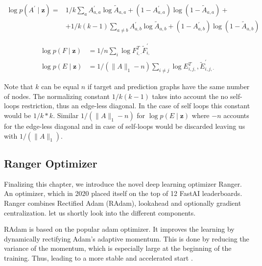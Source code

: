 {\begin{equation}
    \begin{split}
        \log p\left(A^{\prime} \mid \mathbf{z}\right) = &1 / k \sum_{a} A_{a, a}^{\prime} \log \widetilde{A}_{a, a}+\left(1-A_{a, a}^{\prime}\right) \log \left(1-\widetilde{A}_{a, a}\right)+ \\ & +1 / k(k-1) \sum_{a \neq b} A_{a, b}^{\prime} \log \widetilde{A}_{a, b}+\left(1-A_{a, b}^{\prime}\right) \log \left(1-\widetilde{A}_{a, b}\right)
    \end{split}
    \label{eq3:GAVElossA}
\end{equation}

\begin{align}
    \log p(F \mid \mathbf{z}) &=1 / n \sum_{i} \log F_{i, \cdot}^{T} \widetilde{F}_{i,}^{\prime} \\
    \log p(E \mid \mathbf{z}) &=1 /\left(\|A\|_{1}-n\right) \sum_{i \neq j} \log E_{i, j,}^{T}, \widetilde{E}_{i, j, \cdot}^{\prime}
    \label{eq3:GAVElossEF}
\end{align}

Note that $k$ can be equal $n$ if target and prediction graphs have the same number of nodes. The normalizing constant $1 / k(k-1)$ takes into account the no self-loops restriction, thus an edge-less diagonal. In the case of self loops this constant would be $1 / k*k$. Similar $1 /\left(\|A\|_{1}-n\right)$ for $\log p(E \mid \mathbf{z})$ where $-n$ accounts for the edge-less diagonal and in case of self-loops would be discarded leaving us with $1 /\left(\|A\|_{1}\right)$.

\subsection{Ranger Optimizer}
\label{sec3:ranger}

Finalizing this chapter, we introduce the novel deep learning optimizer Ranger. An optimizer, which in 2020 placed itself on the top of 12 FastAI leaderboards. Ranger combines Rectified Adam (RAdam), lookahead and optionally gradient centralization. let us shortly look into the different components.

RAdam is based on the popular adam optimizer. It improves the learning by dynamically rectifying Adam's adaptive momentum. This is done by reducing the variance of the momentum, which is especially large at the beginning of the training. Thus, leading to a more stable and accelerated start \cite{liu_variance_2020}.

}
